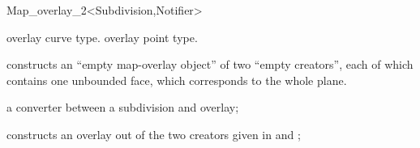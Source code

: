 \begin{ccRefClass}{Map_overlay_2<Subdivision,Notifier>}
  \ccGlue
  \ccGlue


  {overlay curve type.}
  \ccGlue
  {overlay point type.}


    
%     
%    
%    
%    
%    
    

\ccCreation
    
   {constructs an
     ``empty map-overlay object'' of two ``empty creators'', each of which 
     contains one unbounded face, which corresponds to the whole plane.}
  
  {a converter between a subdivision and overlay;}
  
  {constructs an overlay out of the two creators given in  and ;}
  

\end{ccRefClass}
